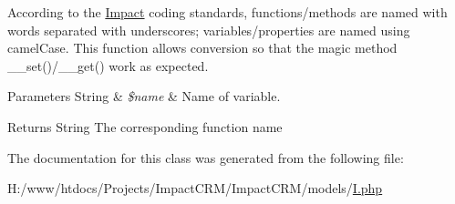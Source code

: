 According to the \hyperlink{namespaceImpact}{Impact} coding standards, functions/methods are named with words separated with underscores; variables/properties are named using camelCase. This function allows conversion so that the magic method \_\-\_\-set()/\_\-\_\-get() work as expected.


\begin{DoxyParams}[1]{Parameters}
String & {\em \$name} & Name of variable. \\
\hline
\end{DoxyParams}
\begin{DoxyReturn}{Returns}
String The corresponding function name 
\end{DoxyReturn}


The documentation for this class was generated from the following file:\begin{DoxyCompactItemize}
\item 
H:/www/htdocs/Projects/ImpactCRM/ImpactCRM/models/\hyperlink{I_8php}{I.php}\end{DoxyCompactItemize}
